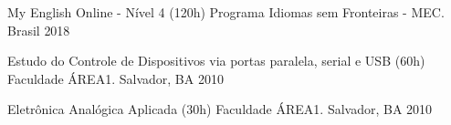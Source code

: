 

\begin{cvhonors}

  \cvhonor
    {My English Online - Nível 4 (120h)} %
    {Programa Idiomas sem Fronteiras - MEC.} %
    {Brasil} %
    {2018} %

  \cvhonor
    {Estudo do Controle de Dispositivos via portas paralela, serial e USB (60h)} %
    {Faculdade ÁREA1.} %
    {Salvador, BA} %
    {2010} %

  \cvhonor
    {Eletrônica Analógica Aplicada (30h)} %
    {Faculdade ÁREA1.} %
    {Salvador, BA} %
    {2010} %

\end{cvhonors}

